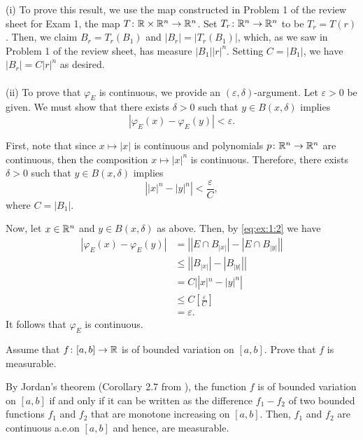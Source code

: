 \begin{solution}
(i) To prove this result, we use the map constructed in Problem 1 of the
review sheet for Exam 1, the map $T\colon\mathbb{R}\times\mathbb{R}^n\to\mathbb{R}^n$. Set
$T_r\colon\mathbb{R}^n\to\mathbb{R}^n$ to be $T_r= T(r)$. Then, we claim
$B_r=T_r(B_1)$ and $|B_r|=|T_r(B_1)|$, which, as we saw in Problem 1 of the
review sheet, has measure $|B_1||r|^n$. Setting $C= |B_1|$, we have
$|B_r|=C|r|^n$ as desired.
\\\\
(ii) To prove that $\varphi_E$ is continuous, we provide an
$(\varepsilon,\delta)$-argument. Let $\varepsilon>0$ be given. We must show
that there exists $\delta>0$ such that $ y \in B( x ,\delta)$ implies
\begin{equation}
\label{eq:ex:1:1}
\left|\varphi_E( x )-\varphi_E( y )\right|<\varepsilon.
\end{equation}

First, note that since $ x \mapsto | x |$ is continuous and polynomials
$p\colon\mathbb{R}^n\to\mathbb{R}^n$ are continuous, then the composition
$ x \mapsto| x |^n$ is continuous. Therefore, there exists $\delta>0$
such that $ y \in B( x ,\delta)$ implies
\begin{equation}
\label{eq:ex:1:2}
\left|| x |^n-| y |^n\right|<\frac{\varepsilon}{C},
\end{equation}
where $C= |B_1|$.

Now, let $x\in\mathbb{R}^n$ and $ y \in B( x ,\delta)$ as above. Then, by
\eqref{eq:ex:1:2} we have
\begin{equation}
\label{eq:ex:1:3}
\begin{aligned}
\left|\varphi_E( x )-\varphi_E( y )\right|
&=\left|
\left|E\cap B_{| x |}\right|
-
\left|E\cap B_{| y |}\right|
\right|\\
&\leq\left| |B_{| x |}|-|B_{| y |}|\right|\\
&=C|\left| x |^n-| y |^n\right|\\
&\leq C\left[\frac{\varepsilon}{C}\right]\\
&=\varepsilon.
\end{aligned}
\end{equation}
It follows that $\varphi_E$ is continuous.
\end{solution}

\begin{problem}
Assume that $f\colon[a,b]\to\mathbb{R}$ is of bounded variation on $[a,b]$. Prove
that $f$ is measurable.
\end{problem}
\begin{solution}
By Jordan's theorem (Corollary 2.7 from \cite[Ch.\@ 2, p.\@
21]{wheeden-zygmund}), the function $f$ is of bounded variation on $[a,b]$
if and only if it can be written as the difference $f_1-f_2$ of two bounded
functions $f_1$ and $f_2$ that are monotone increasing on $[a,b]$. Then,
$f_1$ and $f_2$ are continuous a.e.\@ on $[a,b]$ and hence, are
measurable.
\end{solution}

